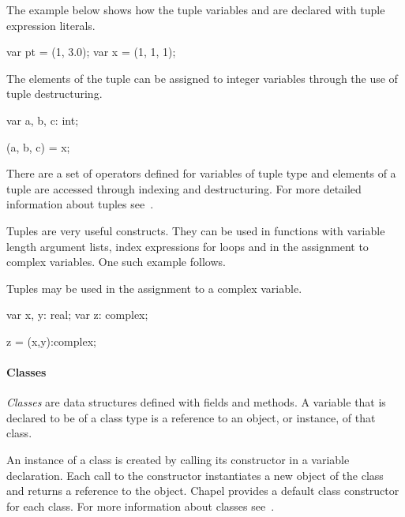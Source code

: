 \begin{example}

The example below shows how the tuple variables  and 
are declared with tuple expression literals.  
\begin{chapel}
var pt = (1, 3.0);
var x = (1, 1, 1);
\end{chapel}

The elements of the tuple  can be assigned to integer variables
through the use of tuple destructuring.
\begin{chapel}
var a, b, c: int;

(a, b, c) = x;
\end{chapel}
\end{example}

There are a set of operators defined for variables of tuple type
and elements of a tuple are accessed through indexing and destructuring.  
For more detailed information about tuples see~.

Tuples are very useful constructs.  They can be used in 
functions with variable length argument lists, index expressions
for  loops and in the assignment to complex variables.
One such example follows. 

\begin{example}
Tuples may be used in the assignment to a complex variable.
\begin{chapel}
var x, y: real;
var z: complex;

z = (x,y):complex;
\end{chapel}
\end{example}

\paragraph{Classes}
\emph{Classes} are data structures defined with fields and methods.
A variable that is declared to be of a class type is a reference
to an object, or instance, of that class. 
 
An instance of a class is created by calling its constructor
in a variable declaration.  Each call to the constructor
instantiates a new object of the class and returns a reference to 
the object.  Chapel provides a default class constructor for each class.
For more information about classes see~.

